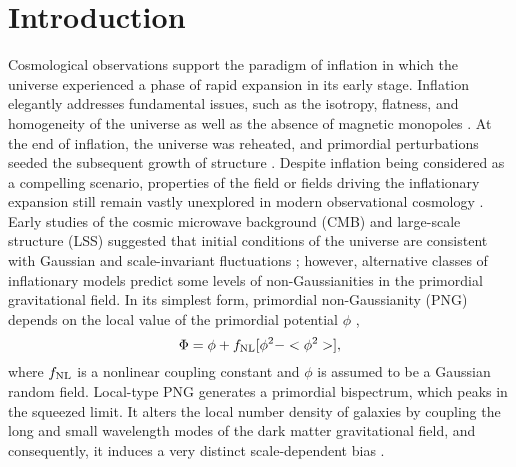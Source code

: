 \section{Introduction}
\label{sec:introduction}
Cosmological observations support the paradigm of inflation in which the universe experienced a phase of rapid expansion in its early stage. Inflation elegantly addresses fundamental issues, such as the isotropy, flatness, and homogeneity of the universe as well as the absence of magnetic monopoles \citep[see, e.g.,][for a review]{weinberg2013observational}. At the end of inflation, the universe was reheated, and primordial perturbations seeded the subsequent growth of structure \citep{kofman1994reheating, bassett2006inflation, lyth2009primordial}. Despite inflation being considered as a compelling scenario, properties of the field or fields driving the inflationary expansion still remain vastly unexplored in modern observational cosmology \citep[see, e.g.,][for a review]{Biagetti2019Galax...7...71B}. Early studies of the cosmic microwave background (CMB) and large-scale structure (LSS) suggested that initial conditions of the universe are consistent with Gaussian and scale-invariant fluctuations \citep{PhysRevD.69.103501, guth2005inflationary}; however, alternative classes of inflationary models predict some levels of non-Gaussianities in the primordial gravitational field. In its simplest form, primordial non-Gaussianity (PNG) depends on the local value of the primordial potential $\phi$ \citep{komatsu2001acoustic},
\begin{equation}
 \Phi = \phi + f_{\rm NL} [\phi^{2} - <\phi^{2}>],
\end{equation}
where $f_{\rm NL}$ is a nonlinear coupling constant and $\phi$ is assumed to be a Gaussian random field. Local-type PNG generates a primordial bispectrum, which peaks in the squeezed limit. It alters the local number density of galaxies by coupling the long and small wavelength modes of the dark matter gravitational field, and consequently, it induces a very distinct scale-dependent bias \citep{dalal2008imprints}. 


